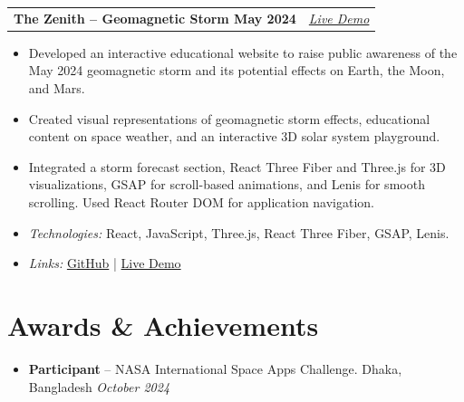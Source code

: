 \documentclass[10pt]{article}
\makeatletter
\newcommand{\entry}[2]{%
  \noindent\begin{tabularx}{\linewidth}{@{}X r@{}}
    \textbf{#1} & \textit{\small #2}
  \end{tabularx}\vspace{-1pt}
}
\makeatother
\begin{document}
\entry{The Zenith -- Geomagnetic Storm May 2024}{\href{https://the-zenith.vercel.app/}{Live Demo}}
\begin{itemize}
    \item Developed an interactive educational website to raise public awareness of the May 2024 geomagnetic storm and its potential effects on Earth, the Moon, and Mars.
    \item Created visual representations of geomagnetic storm effects, educational content on space weather, and an interactive 3D solar system playground.
    \item Integrated a storm forecast section, React Three Fiber and Three.js for 3D visualizations, GSAP for scroll-based animations, and Lenis for smooth scrolling. Used React Router DOM for application navigation.
    \item \textit{Technologies:} React, JavaScript, Three.js, React Three Fiber, GSAP, Lenis.
    \item \textit{Links:} \href{https://github.com/MdMehedi-Hassan/The_Zenith}{GitHub} \;|\;
    \href{https://the-zenith.vercel.app/}{Live Demo}
\end{itemize}



\section{Awards \& Achievements}
\begin{itemize}
  \item \textbf{Participant} -- NASA International Space Apps Challenge. Dhaka, Bangladesh \hfill \textit{October 2024}
\end{itemize}
\end{document}
